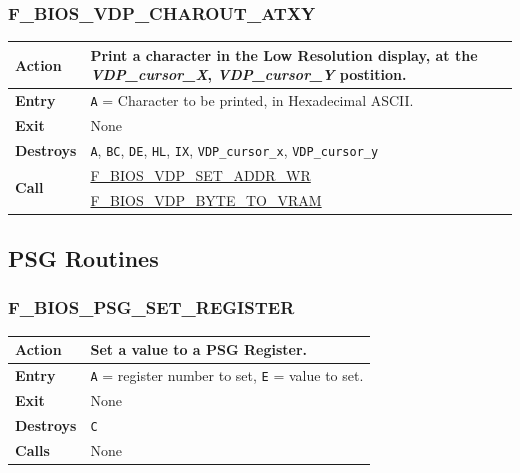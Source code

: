 \documentclass[a4paper,11pt]{article}
\begin{document}
        \subsubsection{F\_BIOS\_VDP\_CHAROUT\_ATXY}
        \label{func:fbiosvdpcharoutatxy}
        \begin{tabular}{l p{9cm}}
            \hline\textbf{Action}
            & Print a character in the \textbf{Low Resolution display}, at the
            \textit{VDP\_cursor\_X}, \textit{VDP\_cursor\_Y} postition.\\
            \hline\textbf{Entry} & \texttt{A} = Character to be printed, in
            Hexadecimal ASCII.\\
            \hline\textbf{Exit} & None\\
            \hline\textbf{Destroys} & \texttt{A}, \texttt{BC}, \texttt{DE},
            \texttt{HL}, \texttt{IX}, \texttt{VDP\_cursor\_x},
            \texttt{VDP\_cursor\_y}\\
            \hline\multirow[t]{2}{4em}{\textbf{Call}}
            & \hyperref[func:fbiosvdpsetaddrwr]{F\_BIOS\_VDP\_SET\_ADDR\_WR}\\
            & \hyperref[func:fbiosvdpbytetovram]{F\_BIOS\_VDP\_BYTE\_TO\_VRAM}\\
            \hline
        \end{tabular}

    \subsection{PSG Routines}

        \subsubsection{F\_BIOS\_PSG\_SET\_REGISTER}
        \label{func:fbiospsgsetregister}
        \begin{tabular}{l p{9cm}}
            \hline\textbf{Action}
            & Set a value to a PSG Register. \\
            \hline\textbf{Entry} & \texttt{A} = register number to set, \texttt{E}
            = value to set.\\
            \hline\textbf{Exit} & None\\
            \hline\textbf{Destroys} & \texttt{C} \\
            \hline\textbf{Calls} & None\\
            \hline
        \end{tabular}
\end{document}
